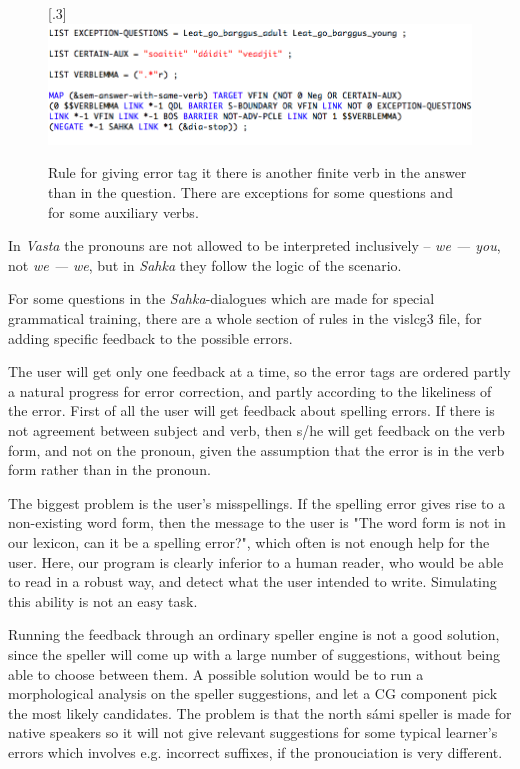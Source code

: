 \documentclass[11pt]{article}
\begin{document}
\begin{figure}[htbp]
\begin{center}
\scalebox{.3}[.3]{\includegraphics{presentation/img/verblemma.png}}\\
\caption{Rule for giving error tag it there is another finite verb in the answer than in the question. There are exceptions for some questions and for some auxiliary verbs.}
\label{sameverb}
\end{center}
\end{figure}


In \textit{Vasta} the pronouns are not allowed to be interpreted inclusively -- \textit{we — you}, not \textit{we — we}, but in \textit{Sahka} they follow the logic of the scenario.

For some questions in the \textit{Sahka}-dialogues which are made for special grammatical training, there are a whole section of rules in the vislcg3 file, for adding specific feedback to the possible errors.

The user will get only one feedback at a time, so the error tags are ordered partly a natural progress for error correction, and partly according to the likeliness of the error. First of all the user will get feedback about spelling errors. If there is not agreement between subject and verb, then s/he will get feedback on the verb form, and not on the pronoun, given the assumption that the error is in the verb form rather than in the pronoun.

The biggest problem is the user's misspellings. If the spelling error gives rise to a non-existing word form, then the message to the user is "The word form is not in our lexicon, can it be a spelling error?", which often is not enough help for the user. Here, our program is clearly inferior to a human reader, who would be able to read in a robust way, and detect what the user intended to write. Simulating this ability is not an easy task.
 
Running the feedback through an ordinary speller engine is not a good solution, since the speller will come up with a large number of suggestions, without being able to choose between them. A possible solution would be to run a morphological analysis on the speller suggestions, and let a CG component pick the most likely candidates. The problem is that the north sámi speller is made for native speakers so it will not give relevant suggestions for some typical learner's errors which involves e.g. incorrect suffixes, if the pronouciation is very different. 
\end{document}
